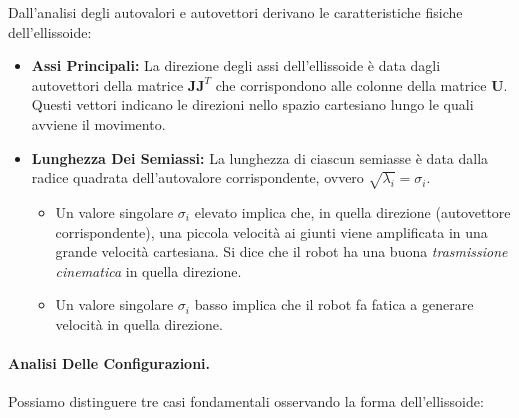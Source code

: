 \documentclass[11pt, a4paper]{report}
\begin{document}
Dall'analisi degli autovalori e autovettori derivano le caratteristiche fisiche dell'ellissoide:

\begin{itemize}
    \item \textbf{Assi Principali:} La direzione degli assi dell'ellissoide è data dagli autovettori della matrice $\bm{J}\bm{J}^T$ che corrispondono alle colonne della matrice $\bm{U}$. Questi vettori indicano le direzioni nello spazio cartesiano lungo le quali avviene il movimento.

    \item \textbf{Lunghezza Dei Semiassi:} La lunghezza di ciascun semiasse è data dalla radice quadrata dell'autovalore corrispondente, ovvero $\sqrt{\lambda_i} = \sigma_i$.
    \begin{itemize}
        \item Un valore singolare $\sigma_i$ elevato implica che, in quella direzione (autovettore corrispondente), una piccola velocità ai giunti viene amplificata in una grande velocità cartesiana. Si dice che il robot ha una buona \emph{trasmissione cinematica} in quella direzione.
        \item Un valore singolare $\sigma_i$ basso implica che il robot fa fatica a generare velocità in quella direzione.
    \end{itemize}
\end{itemize}

\paragraph{Analisi Delle Configurazioni.}
Possiamo distinguere tre casi fondamentali osservando la forma dell'ellissoide:
\end{document}
